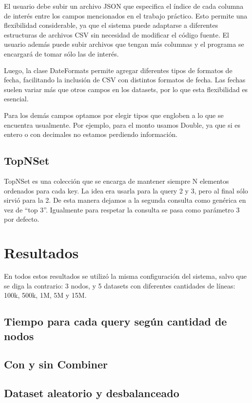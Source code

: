 \documentclass[a4paper,12pt]{article}
\begin{document}
	\bigskip
	
	El usuario debe subir un archivo JSON que especifica el índice de cada columna de interés entre los campos mencionados en el trabajo práctico. Esto permite una flexibilidad considerable, ya que el sistema puede adaptarse a diferentes estructuras de archivos CSV sin necesidad de modificar el código fuente. El usuario además puede subir archivos que tengan más columnas y el programa se encargará de tomar sólo las de interés.
	
	\bigskip
	
	Luego, la clase DateFormats permite agregar diferentes tipos de formatos de fecha, facilitando la inclusión de CSV con distintos formatos de fecha. Las fechas suelen variar más que otros campos en los datasets, por lo que esta flexibilidad es esencial.
	
	\bigskip
	
	Para los demás campos optamos por elegir tipos que engloben a lo que se encuentra usualmente. Por ejemplo, para el monto usamos Double, ya que si es entero o con decimales no estamos perdiendo información.
	
	\subsection{TopNSet}
	
	TopNSet es una colección que se encarga de mantener siempre N elementos ordenados para cada key. La idea era usarla para la query 2 y 3, pero al final sólo sirvió para la 2. De esta manera dejamos a la segunda consulta como genérica en vez de ``top 3''. Igualmente para respetar la consulta se pasa como parámetro 3 por defecto.
	
	\newpage
	
	\section{Resultados}
	
	En todos estos resultados se utilizó la misma configuración del sistema, salvo que se diga la contrario: 3 nodos, y 5 datasets con diferentes cantidades de líneas: 100k, 500k, 1M, 5M y 15M.
	
	\subsection{Tiempo para cada query según cantidad de nodos}
	
	\subsection{Con y sin Combiner}
	
	\subsection{Dataset aleatorio y desbalanceado}
	
	
\end{document}
